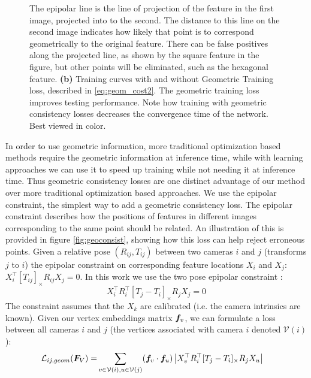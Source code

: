 \documentclass{article} %
\newcommand{\cross}[1]{[#1]_{\times}}
\begin{document}
\begin{figure}[t]
{  The epipolar line is the line of projection of the feature in the first image, projected into to the second.
  The distance to this line on the second image indicates how likely that point is to correspond geometrically to the original feature.
  There can be false positives along the projected line, as shown by the square feature in the figure, but other points will be eliminated, such as the hexagonal feature.
  \textbf{(b)} Training curves with and without Geometric Training loss, described in \ref{eq:geom_cost2}.
  The geometric training loss improves testing performance.
  Note how training with geometric consistency losses decreases the convergence time of the network.
  Best viewed in color.
}
\label{fig:1}
\end{figure}


In order to use geometric information, more traditional optimization based methods require the geometric information at inference time, while with learning approaches we can use it to speed up training while not needing it at inference time.
Thus geometric consistency losses are one distinct advantage of our method over more traditional optimization based approaches.
We use the epipolar constraint, the simplest way to add a geometric consistency loss.
The epipolar constraint describes how the positions of features in different images corresponding to the same point should be related.
An illustration of this is provided in figure \ref{fig:geoconsist}, showing how this loss can help reject erroneous points.
Given a relative pose $(R_{ij}, T_{ij})$ between two cameras $i$ and $j$  (transforms $j$ to $i$) the epipolar constraint on corresponding feature locations $X_i$ and $X_j$: $X_{i}^\top \cross{T_{ij}}R_{ij} X_{j} = 0$.
In this work we use the two pose epipolar constraint \citep{tron2014quotient}:
\begin{equation}
X_{i}^\top R_{i}^\top \cross{T_{j} - T_{i}}R_{j} X_{j} = 0
\label{eq:essential_constraint}
\end{equation}
The constraint assumes that the $X_k$ are calibrated (i.e. the camera intrinsics are known). 
Given our vertex embeddings matrix ${\bm{f}}_v$, we can formulate a loss between all cameras $i$ and $j$ (the vertices associated with camera $i$ denoted $\mathcal{V}(i)$):
\begin{align}
\mathcal{L}_{ij,geom}(\mF_V) = 
&\sum_{v \in \mathcal{V}(i),u \in \mathcal{V}(j)} (\vf_v \cdot \vf_u) \left|X_{v}^\top R_{i}^\top \cross{T_{j} - T_{i}}R_{j} X_{u}\right|
\label{eq:geom_cost}
\end{align}
\end{document}
